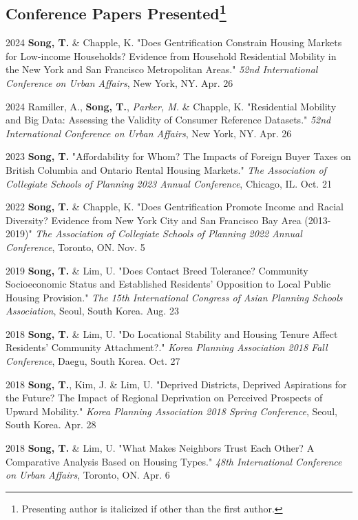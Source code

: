 \documentclass[12pt,letterpaper]{report}
\begin{document}
    \subsection*{Conference Papers Presented\footnote{Presenting author is italicized if other than the first author.}}
    \begin{tablist}
      \item[2024] \tab{}\textbf{Song, T.} \& Chapple, K. "Does Gentrification Constrain Housing Markets for Low-income Households? Evidence from Household Residential Mobility in the New York and San Francisco Metropolitan Areas." \emph{52nd International Conference on Urban Affairs}, New York, NY. Apr. 26
      \item[2024] \tab{}Ramiller, A., \textbf{Song, T.}, \emph{Parker, M.} \& Chapple, K. "Residential Mobility and Big Data: Assessing the Validity of Consumer Reference Datasets." \emph{52nd International Conference on Urban Affairs}, New York, NY. Apr. 26
      \item[2023] \tab{}\textbf{Song, T.} "Affordability for Whom? The Impacts of Foreign Buyer Taxes on British Columbia and Ontario Rental Housing Markets." \emph{The Association of Collegiate Schools of Planning 2023 Annual Conference}, Chicago, IL. Oct. 21
      \item[2022] \tab{}\textbf{Song, T.} \& Chapple, K. "Does Gentrification Promote Income and Racial Diversity? Evidence from New York City and San Francisco Bay Area (2013-2019)" \emph{The Association of Collegiate Schools of Planning 2022 Annual Conference}, Toronto, ON. Nov. 5
      \item[2019] \tab{}\textbf{Song, T.} \& Lim, U. "Does Contact Breed Tolerance? Community Socioeconomic Status and Established Residents' Opposition to Local Public Housing Provision." \emph{The 15th International Congress of Asian Planning Schools Association}, Seoul, South Korea. Aug. 23
      \item[2018] \tab{}\textbf{Song, T.} \& Lim, U.  "Do Locational Stability and Housing Tenure Affect Residents' Community Attachment?." \emph{Korea Planning Association 2018 Fall Conference}, Daegu, South Korea. Oct. 27 
      \item[2018] \tab{}\textbf{Song, T.}, Kim, J. \& Lim, U. "Deprived Districts, Deprived Aspirations for the Future? The Impact of Regional Deprivation on Perceived Prospects of Upward Mobility." \emph{Korea Planning Association 2018 Spring Conference}, Seoul, South Korea. Apr. 28
        \item[2018] \tab{}\textbf{Song, T.} \& Lim, U. "What Makes Neighbors Trust Each Other? A Comparative Analysis Based on Housing Types." \emph{48th International Conference on Urban Affairs}, Toronto, ON. Apr. 6
    \end{tablist}
    
\end{document}
